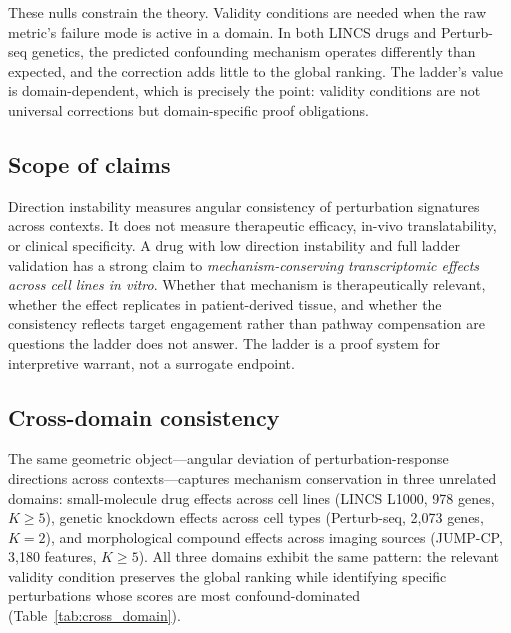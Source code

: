 \documentclass{article}
\begin{document}
These nulls constrain the theory. Validity conditions are needed when the raw
metric's failure mode is active in a domain. In both LINCS drugs and
Perturb-seq genetics, the predicted confounding mechanism operates differently
than expected, and the correction adds little to the global ranking. The
ladder's value is domain-dependent, which is precisely the point: validity
conditions are not universal corrections but domain-specific proof obligations.

\subsection{Scope of claims}

Direction instability measures angular consistency of perturbation signatures
across contexts. It does not measure therapeutic efficacy, in-vivo
translatability, or clinical specificity. A drug with low direction
instability and full ladder validation has a strong claim to
\emph{mechanism-conserving transcriptomic effects across cell lines in
vitro}. Whether that mechanism is therapeutically relevant, whether the
effect replicates in patient-derived tissue, and whether the consistency
reflects target engagement rather than pathway compensation are questions
the ladder does not answer. The ladder is a proof system for
interpretive warrant, not a surrogate endpoint.

\subsection{Cross-domain consistency}

The same geometric object---angular deviation of perturbation-response
directions across contexts---captures mechanism conservation in three
unrelated domains: small-molecule drug effects across cell lines (LINCS
L1000, 978 genes, $K \geq 5$), genetic knockdown effects across
cell types (Perturb-seq, 2{,}073 genes, $K = 2$), and morphological
compound effects across imaging sources (JUMP-CP, 3{,}180 features,
$K \geq 5$). All three domains exhibit the same pattern: the relevant
validity condition preserves the global ranking while identifying specific
perturbations whose scores are most confound-dominated
(Table~\ref{tab:cross_domain}).
\end{document}
